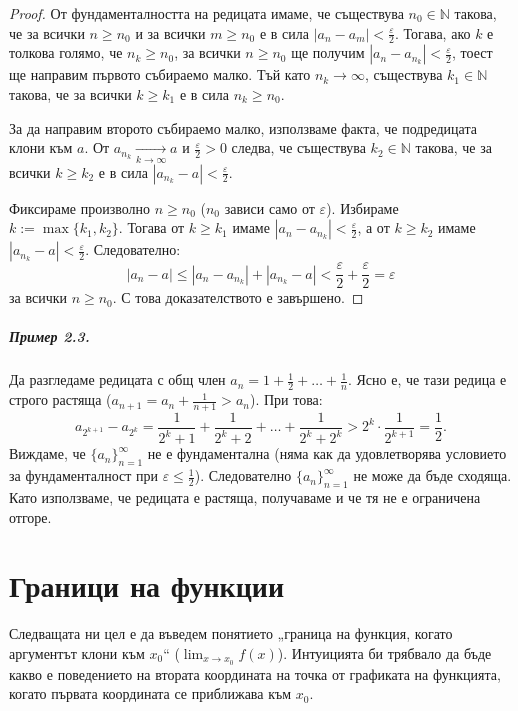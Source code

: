 \begin{proof}
От фундаменталността на редицата имаме, че съществува $n_0 \in \mathbb{N}$ такова, че за всички $n \ge n_0$ и за всички $m \ge n_0$ е в сила $|a_n - a_m| < \frac{\varepsilon}{2}$. Тогава, ако $k$ е толкова голямо, че $n_k \ge n_0$, за всички $n \ge n_0$ ще получим $|a_n - a_{n_k}| < \frac{\varepsilon}{2}$, тоест ще направим първото събираемо малко. Тъй като $n_k \to \infty$, съществува $k_1 \in \mathbb{N}$ такова, че за всички $k \ge k_1$ е в сила $n_k \ge n_0$.

За да направим второто събираемо малко, използваме факта, че подредицата клони към $a$. От $a_{n_k} \xrightarrow[k\to\infty]{} a$ и $\frac{\varepsilon}{2} > 0$ следва, че съществува $k_2 \in \mathbb{N}$ такова, че за всички $k \ge k_2$ е в сила $|a_{n_k} - a| < \frac{\varepsilon}{2}$.

Фиксираме произволно $n \ge n_0$ ($n_0$ зависи само от $\varepsilon$). Избираме $k := \max\{k_1, k_2\}$. Тогава от $k \ge k_1$ имаме $|a_n - a_{n_k}| < \frac{\varepsilon}{2}$, а от $k \ge k_2$ имаме $|a_{n_k} - a| < \frac{\varepsilon}{2}$. Следователно:
\[
|a_n - a| \le |a_n - a_{n_k}| + |a_{n_k} - a| < \frac{\varepsilon}{2} + \frac{\varepsilon}{2} = \varepsilon
\]
за всички $n \ge n_0$. С това доказателството е завършено.
\end{proof}

\paragraph{Пример 2.3.}
Да разгледаме редицата с общ член $a_n = 1 + \frac{1}{2} + \dots + \frac{1}{n}$. Ясно е, че тази редица е строго растяща ($a_{n+1} = a_n + \frac{1}{n+1} > a_n$). При това:
\[
a_{2^{k+1}} - a_{2^k} = \frac{1}{2^k + 1} + \frac{1}{2^k + 2} + \dots + \frac{1}{2^k + 2^k} > 2^k \cdot \frac{1}{2^{k+1}} = \frac{1}{2}.
\]
Виждаме, че $\{a_n\}_{n=1}^{\infty}$ не е фундаментална (няма как да удовлетворява условието за фундаменталност при $\varepsilon \le \frac{1}{2}$). Следователно $\{a_n\}_{n=1}^{\infty}$ не може да бъде сходяща. Като използваме, че редицата е растяща, получаваме и че тя не е ограничена отгоре.

\chapter{Граници на функции}

Следващата ни цел е да въведем понятието „граница на функция, когато аргументът клони към $x_0$“ ($\lim_{x\to x_0} f(x)$). Интуицията би трябвало да бъде какво е поведението на втората координата на точка от графиката на функцията, когато първата координата се приближава към $x_0$.

